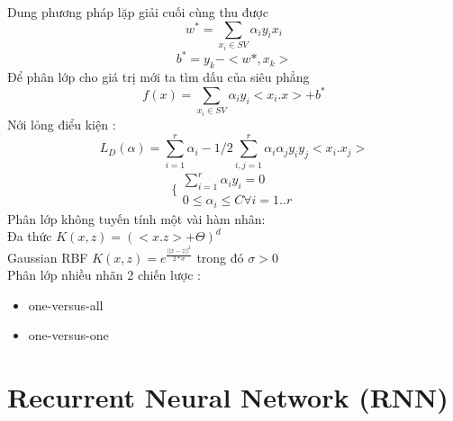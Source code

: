 \documentclass[a4paper,12pt]{report}
\begin{document}
Dung phương pháp lặp giải cuối cùng thu được
$$w^* =\sum_{x_i \in SV} \alpha_i y_i x_i  $$
$$b^*=y_k-<w*,x_k>$$
Để phân lớp cho giá trị mới ta tìm dấu của siêu phẳng $$ f(x)=\sum_{x_i \in SV} \alpha_i y_i <x_i .x>+b^*$$
Nới lỏng điểu kiện :
$$L_D(\alpha)=\sum_{i=1}^r \alpha_i-1/2 \sum_{i,j=1}^{r}\alpha_i \alpha_j y_i y_j<x_i.x_j> $$
$$
\{ \begin{array}{l}
\sum_{i=1 } ^{r} \alpha_i y_i =0 \\
0 \leq \alpha_i \leq C \forall i=1..r
\end{array}
$$
Phân lớp không tuyến tính một vài hàm nhân:\\
Đa thức $K(x,z)=(<x.z>+\Theta)^d $\\
Gaussian RBF $K(x,z)=e^{\frac{||x-z||^2}{2*\sigma}}$ trong đó $\sigma >0$\\
Phân lớp nhiều nhãn 2 chiến lược :
\begin{itemize}
\item one-versus-all
\item one-versus-one 
\end{itemize}
\section{Recurrent Neural Network (RNN)}
\end{document}
